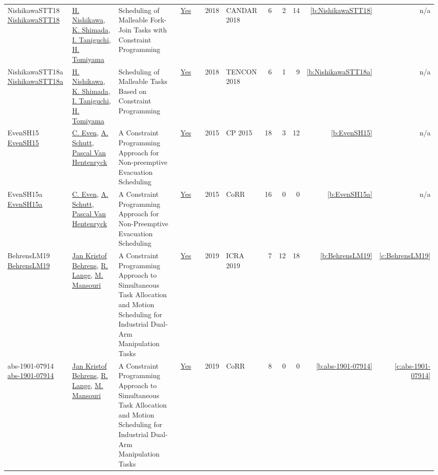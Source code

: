 {\begin{longtable}{>{\raggedright\arraybackslash}p{3cm}>{\raggedright\arraybackslash}p{6cm}>{\raggedright\arraybackslash}p{6.5cm}rrrp{2.5cm}rrrrr}
NishikawaSTT18 \href{https://doi.org/10.1109/CANDAR.2018.00025}{NishikawaSTT18} & \hyperref[auth:a534]{H. Nishikawa}, \hyperref[auth:a535]{K. Shimada}, \hyperref[auth:a536]{I. Taniguchi}, \hyperref[auth:a537]{H. Tomiyama} & Scheduling of Malleable Fork-Join Tasks with Constraint Programming & \href{../works/NishikawaSTT18.pdf}{Yes} & \cite{NishikawaSTT18} & 2018 & CANDAR 2018 & 6 & 2 & 14 & \ref{b:NishikawaSTT18} & n/a\\
NishikawaSTT18a \href{https://doi.org/10.1109/TENCON.2018.8650168}{NishikawaSTT18a} & \hyperref[auth:a534]{H. Nishikawa}, \hyperref[auth:a535]{K. Shimada}, \hyperref[auth:a536]{I. Taniguchi}, \hyperref[auth:a537]{H. Tomiyama} & Scheduling of Malleable Tasks Based on Constraint Programming & \href{../works/NishikawaSTT18a.pdf}{Yes} & \cite{NishikawaSTT18a} & 2018 & TENCON 2018 & 6 & 1 & 9 & \ref{b:NishikawaSTT18a} & n/a\\
EvenSH15 \href{https://doi.org/10.1007/978-3-319-23219-5_40}{EvenSH15} & \hyperref[auth:a219]{C. Even}, \hyperref[auth:a125]{A. Schutt}, \hyperref[auth:a149]{Pascal Van Hentenryck} & A Constraint Programming Approach for Non-preemptive Evacuation Scheduling & \href{../works/EvenSH15.pdf}{Yes} & \cite{EvenSH15} & 2015 & CP 2015 & 18 & 3 & 12 & \ref{b:EvenSH15} & n/a\\
EvenSH15a \href{http://arxiv.org/abs/1505.02487}{EvenSH15a} & \hyperref[auth:a219]{C. Even}, \hyperref[auth:a125]{A. Schutt}, \hyperref[auth:a149]{Pascal Van Hentenryck} & A Constraint Programming Approach for Non-Preemptive Evacuation Scheduling & \href{../works/EvenSH15a.pdf}{Yes} & \cite{EvenSH15a} & 2015 & CoRR & 16 & 0 & 0 & \ref{b:EvenSH15a} & n/a\\
BehrensLM19 \href{https://doi.org/10.1109/ICRA.2019.8794022}{BehrensLM19} & \hyperref[auth:a543]{Jan Kristof Behrens}, \hyperref[auth:a544]{R. Lange}, \hyperref[auth:a545]{M. Mansouri} & A Constraint Programming Approach to Simultaneous Task Allocation and Motion Scheduling for Industrial Dual-Arm Manipulation Tasks & \href{../works/BehrensLM19.pdf}{Yes} & \cite{BehrensLM19} & 2019 & ICRA 2019 & 7 & 12 & 18 & \ref{b:BehrensLM19} & \ref{c:BehrensLM19}\\
abs-1901-07914 \href{http://arxiv.org/abs/1901.07914}{abs-1901-07914} & \hyperref[auth:a543]{Jan Kristof Behrens}, \hyperref[auth:a544]{R. Lange}, \hyperref[auth:a545]{M. Mansouri} & A Constraint Programming Approach to Simultaneous Task Allocation and Motion Scheduling for Industrial Dual-Arm Manipulation Tasks & \href{../works/abs-1901-07914.pdf}{Yes} & \cite{abs-1901-07914} & 2019 & CoRR & 8 & 0 & 0 & \ref{b:abs-1901-07914} & \ref{c:abs-1901-07914}\\

\end{longtable}}
